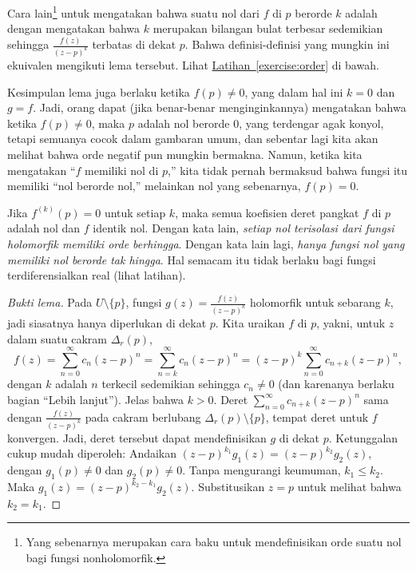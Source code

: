 \documentclass[12pt,openany]{book}
\newcommand{\myquote}[1]{``#1''}
\theoremstyle{plain}
\theoremstyle{remark}
\theoremstyle{definition}
\theoremstyle{exercise}
\theoremstyle{example}
\newcommand{\exerciseref}[1]{\hyperref[#1]{Latihan~\ref*{#1}}}
\begin{document}
Cara lain\footnote{Yang sebenarnya merupakan cara baku untuk mendefinisikan orde suatu
nol bagi fungsi nonholomorfik.}
untuk mengatakan bahwa suatu nol dari $f$ di $p$ berorde $k$ adalah dengan mengatakan bahwa
$k$ merupakan bilangan bulat terbesar sedemikian sehingga $\frac{f(z)}{{(z-p)}^{k}}$ terbatas
di dekat $p$. Bahwa definisi-definisi yang mungkin ini ekuivalen
mengikuti lema tersebut. Lihat \exerciseref{exercise:order} di bawah.

Kesimpulan lema juga berlaku ketika $f(p) \neq 0$,
yang dalam hal ini
$k=0$ dan $g = f$. Jadi, orang dapat (jika benar-benar menginginkannya)
mengatakan bahwa ketika $f(p) \neq 0$, maka $p$ adalah
nol berorde $0$, yang terdengar agak konyol, tetapi semuanya cocok dalam gambaran
umum, dan sebentar lagi kita akan melihat bahwa orde negatif pun mungkin bermakna.
Namun, ketika kita mengatakan \myquote{$f$ memiliki nol di $p$,}
kita tidak pernah bermaksud bahwa fungsi itu memiliki
\myquote{nol berorde nol,} melainkan nol yang sebenarnya, $f(p) = 0$.

Jika $f^{(k)}(p) = 0$
untuk setiap $k$, maka semua koefisien deret pangkat $f$ di $p$ adalah
nol dan $f$ identik nol. Dengan kata lain, \emph{setiap
nol terisolasi dari fungsi holomorfik memiliki orde berhingga}.
Dengan kata lain lagi, \emph{hanya fungsi nol yang memiliki nol berorde tak hingga}.
Hal semacam itu tidak berlaku bagi fungsi terdiferensialkan real (lihat latihan).

\begin{proof}[Bukti lema]
Pada $U \setminus \{ p \}$, fungsi $g(z) = \frac{f(z)}{{(z-p)}^k}$
holomorfik untuk sebarang $k$, jadi siasatnya hanya diperlukan di dekat $p$. Kita uraikan $f$ di
$p$,
yakni, untuk $z$ dalam suatu cakram $\Delta_r(p)$,
\begin{equation*}
f(z) =
\sum_{n=0}^\infty c_n {(z-p)}^n =
\sum_{n=k}^\infty c_n {(z-p)}^n 
= {(z-p)}^k
\sum_{n=0}^\infty c_{n+k} {(z-p)}^{n} ,
\end{equation*}
dengan $k$ adalah $n$ terkecil sedemikian sehingga $c_n \neq 0$
(dan karenanya berlaku bagian \myquote{Lebih lanjut}).
Jelas bahwa $k > 0$.
Deret $\sum_{n=0}^\infty c_{n+k}{(z-p)}^n$
sama dengan $\frac{f(z)}{{(z-p)}^k}$ pada
cakram berlubang $\Delta_r(p)\setminus \{ p \}$, tempat deret
untuk $f$ konvergen.
Jadi, deret tersebut dapat mendefinisikan $g$ di dekat $p$. Ketunggalan cukup mudah diperoleh:
Andaikan ${(z-p)}^{k_1} g_1(z) = {(z-p)}^{k_2} g_2(z)$, dengan
$g_1(p) \neq 0$ dan $g_2(p) \neq 0$.
Tanpa mengurangi keumuman,
$k_1 \leq k_2$.
Maka
$g_1(z) = {(z-p)}^{k_2-k_1} g_2(z)$. Substitusikan $z=p$ untuk melihat bahwa $k_2 =
k_1$.
\end{proof}
\end{document}
